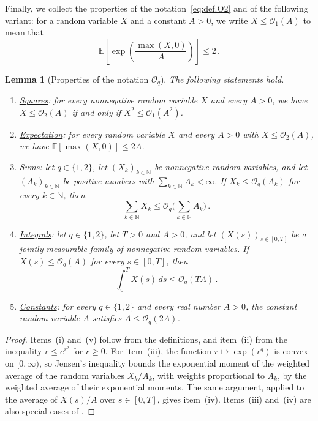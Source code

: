 \documentclass[11pt]{amsart}
\newtheorem{lemma}[theorem]{Lemma}
\numberwithin{equation}{section}
\newcommand{\E}{\mathbb{E}}
\newcommand{\cO}{\mathcal{O}}
\begin{document}
Finally, we collect the properties of the notation~\eqref{eq:def.O2} and of the following variant: for a random variable $X$ and a constant $A > 0$, we write $X \leq \cO_1(A)$ to mean that
\begin{equation*}
    \E \left[ \exp \left( \frac{\max(X, 0)}{A} \right) \right] \leq 2\,.
\end{equation*}

\begin{lemma}[Properties of the notation $\cO_q$] \label{lem:O}
The following statements hold.
\begin{enumerate}
    \item[\textup{(i)}] \underline{\emph{Squares}}: for every nonnegative random variable $X$ and every $A > 0$, we have $X \leq \cO_2(A)$ if and only if $X^2 \leq \cO_1(A^2)$.
    \item[\textup{(ii)}] \underline{\emph{Expectation}}: for every random variable $X$ and every $A > 0$ with $X \leq \cO_2(A)$, we have $\E[\max(X, 0)] \leq 2A$.
    \item[\textup{(iii)}] \underline{\emph{Sums}}: let $q \in \{1,2\}$, let $(X_k)_{k \in \mathbb{N}}$ be nonnegative random variables, and let $(A_k)_{k \in \mathbb{N}}$ be positive numbers with $\sum_{k \in \mathbb{N}} A_k < \infty$.
    If $X_k \leq \cO_q(A_k)$ for every $k \in \mathbb{N}$, then
    \begin{equation*}
        \sum_{k \in \mathbb{N}} X_k \leq \cO_q \biggl( \sum_{k \in \mathbb{N}} A_k \biggr)\,.
    \end{equation*}
    \item[\textup{(iv)}] \underline{\emph{Integrals}}: let $q \in \{1,2\}$, let $T > 0$ and $A > 0$, and let $(X(s))_{s \in [0,T]}$ be a jointly measurable family of nonnegative random variables.
    If $X(s) \leq \cO_q(A)$ for every $s \in [0,T]$, then
    \begin{equation*}
        \int_0^T X(s) \,ds \leq \cO_q(T A)\,.
    \end{equation*}
    \item[\textup{(v)}] \underline{\emph{Constants}}: for every $q \in \{1,2\}$ and every real number $A > 0$, the constant random variable $A$ satisfies $A \leq \cO_q(2A)$.
\end{enumerate}
\end{lemma}

\begin{proof}
Items~(i) and~(v) follow from the definitions, and item~(ii) from the inequality $r \leq e^{r^2}$ for $r \geq 0$.
For item~(iii), the function $r \mapsto \exp(r^q)$ is convex on $[0,\infty)$, so Jensen's inequality bounds the exponential moment of the weighted average of the random variables $X_k/A_k$, with weights proportional to $A_k$, by the weighted average of their exponential moments.
The same argument, applied to the average of $X(s)/A$ over $s \in [0,T]$, gives item~(iv).
Items~(iii) and~(iv) are also special cases of \citet*[Lemma~A.4]{AKM2019}.
\end{proof}
\end{document}
